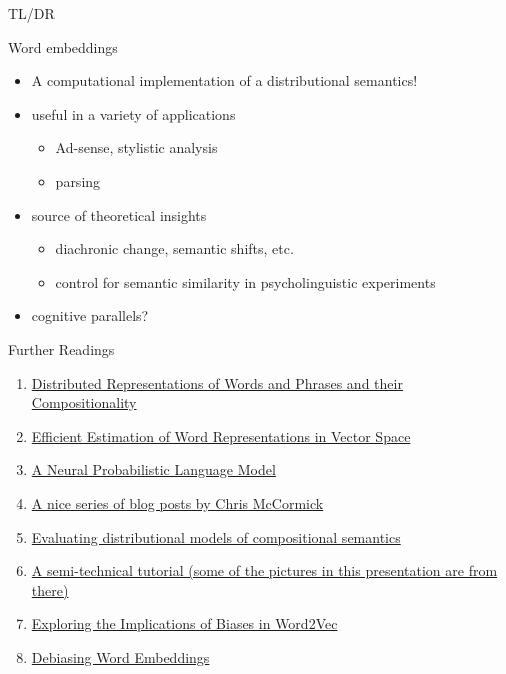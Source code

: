 \documentclass[professionalfonts, xcolor={usenames,svgnames,x11names,table}]{beamer}
\begin{document}
\begin{frame}{TL/DR}
\begin{block}{Word embeddings}
\begin{itemize}
\item A computational implementation of a \alert{distributional semantics}!
\end{itemize}
\end{block}
\begin{itemize}
\item useful in a variety of applications
\begin{itemize}
\item Ad-sense, stylistic analysis
\item parsing 
\end{itemize}
\item source of theoretical insights
\begin{itemize}
\item diachronic change, semantic shifts, etc.
\item control for semantic similarity in psycholinguistic experiments
\end{itemize}
\item cognitive parallels?
\end{itemize}
\vspace{0.3cm}
\end{frame}

\begin{frame}{Further Readings}
\begin{enumerate}
\item \href{https://papers.nips.cc/paper/5021-distributed-representations-of-words-and-phrases-and-their-compositionality.pdf}{Distributed Representations of Words and Phrases and their Compositionality}
\item \href{https://arxiv.org/pdf/1301.3781.pdf}{Efficient Estimation of Word Representations in Vector Space}
\item \href{http://www.jmlr.org/papers/volume3/bengio03a/bengio03a.pdf}{A Neural Probabilistic Language Model}
\item \href{http://mccormickml.com/}{A nice series of blog posts by Chris McCormick}
\item \href{http://sro.sussex.ac.uk/id/eprint/61062/1/Batchkarov,\%20Miroslav\%20Manov.pdf}{Evaluating distributional models of compositional semantics}
\item  \href{https://israelg99.github.io/2017-03-23-Word2Vec-Explained/}{A semi-technical tutorial (some of the pictures in this presentation are from there)}
\item \href{http://www.mattkenney.me/google-word2vec-biases/}{Exploring the Implications of Biases in Word2Vec}
\item \href{https://arxiv.org/pdf/1607.06520.pdf}{Debiasing Word Embeddings}
\end{enumerate}
\end{frame}
\end{document}
